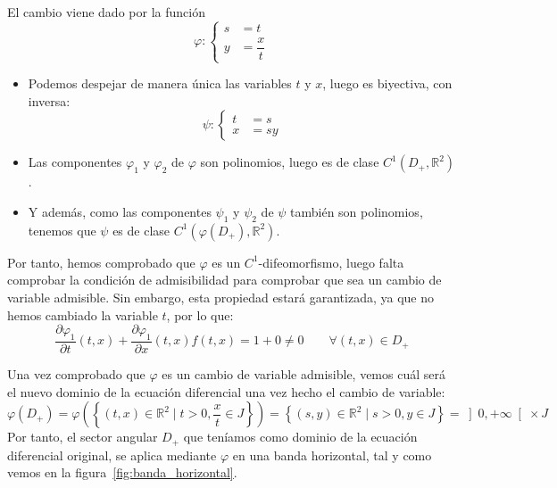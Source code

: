 El cambio viene dado por la función
\begin{equation*}
    \varphi : \left\{\begin{array}{rl}
            s &= t \\
            y &= \dfrac{x}{t}
    \end{array}\right.
\end{equation*}
\begin{itemize}
    \item Podemos despejar de manera única las variables $t$ y $x$, luego es biyectiva, con inversa:
\begin{equation*}
    \psi : \left\{\begin{array}{rl}
            t &= s \\
            x &= s y
    \end{array}\right.
\end{equation*}
    \item Las componentes $\varphi_1$ y $\varphi_2$ de $\varphi$ son polinomios, luego es de clase $C^1(D_+, \mathbb{R}^2)$.
    \item Y además, como las componentes $\psi_1$ y $\psi_2$ de $\psi$ también son polinomios, tenemos que $\psi$ es de clase $C^1(\varphi(D_+), \mathbb{R}^2)$.
\end{itemize}
Por tanto, hemos comprobado que $\varphi$ es un $C^1$-difeomorfismo, luego falta comprobar la condición de admisibilidad para comprobar que sea un cambio de variable admisible. Sin embargo, esta propiedad estará garantizada, ya que no hemos cambiado la variable $t$, por lo que:
\begin{equation*}
    \dfrac{\partial\varphi_1}{\partial t}(t,x) + \dfrac{\partial\varphi_1}{\partial x}(t,x) f(t,x) = 1 + 0 \neq 0 \qquad \forall (t,x)\in D_+
\end{equation*}

\noindent
Una vez comprobado que $\varphi$ es un cambio de variable admisible, vemos cuál será el nuevo dominio de la ecuación diferencial una vez hecho el cambio de variable:
\begin{equation*}
    \varphi(D_+) = \varphi\left(\left\{(t,x)\in \mathbb{R}^2 \mid t > 0, \dfrac{x}{t}\in J\right\}\right) = \left\{(s,y)\in \mathbb{R}^2 \mid s > 0, y\in J\right\} = \left]0, +\infty\right[ \times J
\end{equation*}
Por tanto, el sector angular $D_+$ que teníamos como dominio de la ecuación diferencial original, se aplica mediante $\varphi$ en una banda horizontal, tal y como vemos en la figura~\ref{fig:banda_horizontal}.

